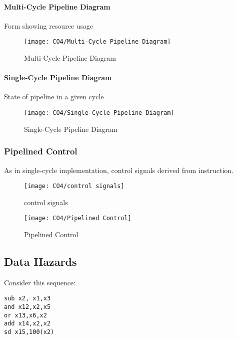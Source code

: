 \paragraph{Multi-Cycle Pipeline Diagram}
Form showing resource usage
\begin{figure}[!htb]
    \centering
    \texttt{[image: CO4/Multi-Cycle Pipeline Diagram]}
    \caption{Multi-Cycle Pipeline Diagram}
\end{figure}

\paragraph{Single-Cycle Pipeline Diagram}
State of pipeline in a given cycle
\begin{figure}[!htb]
    \centering
    \texttt{[image: CO4/Single-Cycle Pipeline Diagram]}
    \caption{Single-Cycle Pipeline Diagram}
\end{figure}

\subsubsection{Pipelined Control}


As in single-cycle implementation, control signals derived from instruction. 

\begin{figure}[!htb]
    \centering
    \texttt{[image: CO4/control signals]}
    \caption{control signals}
\end{figure}

\begin{figure}[!htb]
    \centering
    \texttt{[image: CO4/Pipelined Control]}
    \caption{Pipelined Control}
\end{figure}

\subsection{Data Hazards}
Consider this sequence:
\begin{lstlisting}[language={[x86masm]Assembler}]
sub x2, x1,x3
and x12,x2,x5
or x13,x6,x2
add x14,x2,x2
sd x15,100(x2)
\end{lstlisting}

